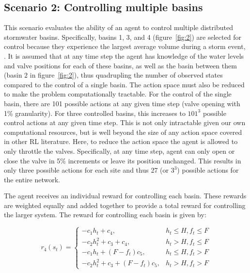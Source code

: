 \subsection{Scenario 2: Controlling multiple basins}

This scenario evaluates the ability of an agent to control multiple distributed stormwater basins.
Specifically, basins 1, 3, and 4 (figure~\ref{fig:2}) are selected for control because they experience the largest average volume during a storm event, .
It is assumed that at any time step the agent has knowledge of the water levels and valve positions for each of these basins, as well as the basin between them (basin $2$ in figure~\ref{fig:2}), thus quadrupling the number of observed states compared to the control of a single basin.
The action space must also be reduced to make the problem computationally tractable.
For the control of the single basin, there are 101 possible actions at any given time step (valve opening with 1\% granularity).
For three controlled basins, this increases to $101^3$ possible control actions at any given time step. This is not only intractable given our own computational resources, but is well beyond the size of any action space covered in other RL literature.
Here, to reduce the action space the agent is allowed to only throttle the valves. Specifically, at any time step, agent can only open or close the valve in 5\% increments or leave its position unchanged.
This results in only three possible actions for each site and thus 27 (or $3^3$) possible actions for the entire network.



The agent receives an individual reward for controlling each basin. These rewards are weighted equally and added together to provide a total reward for controlling the larger system. The reward for controlling each basin is given by:


\begin{equation}
	r_4 (s_t) = \begin{cases}
		-c_1 h_t+c_4, & h_t \leq H, f_t \leq F \\
		-c_2 h_t^2+c_3+c_4, & h_t > H, f_t \leq F\\
		-c_1 h_t+(F-f_t)c_5, & h_t \leq H ,f_t > F\\
		-c_2 h_t^2+c_3+(F-f_t ) c_5, &  h_t>H ,f_t>F
	\end{cases}
\end{equation}

